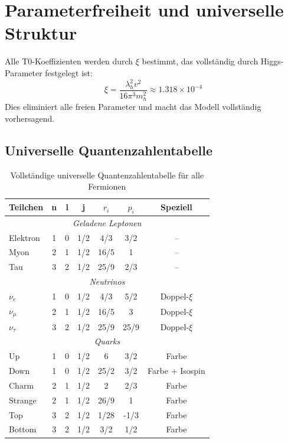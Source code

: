 \section{Parameterfreiheit und universelle Struktur}
\label{sec:parameter_free_nature}

\begin{important}
	Alle T0-Koeffizienten werden durch $\xi$ bestimmt, das vollständig durch Higgs-Parameter festgelegt ist:
	\begin{equation}
		\xi = \frac{\lambda_h^2 v^2}{16\pi^3 m_h^2} \approx 1.318 \times 10^{-4}
	\end{equation}
	Dies eliminiert alle freien Parameter und macht das Modell vollständig vorhersagend.
\end{important}

\subsection{Universelle Quantenzahlentabelle}
\label{subsec:universal_quantum_table}

\begin{table}[H]
	\centering
	\begin{tabular}{lcccccc}
		\toprule
		\textbf{Teilchen} & \textbf{n} & \textbf{l} & \textbf{j} & \textbf{$r_i$} & \textbf{$p_i$} & \textbf{Speziell} \\
		\midrule
		\multicolumn{7}{c}{\textit{Geladene Leptonen}} \\
		\midrule
		Elektron & 1 & 0 & 1/2 & 4/3 & 3/2 & -- \\
		Myon & 2 & 1 & 1/2 & 16/5 & 1 & -- \\
		Tau & 3 & 2 & 1/2 & 25/9 & 2/3 & -- \\
		\midrule
		\multicolumn{7}{c}{\textit{Neutrinos}} \\
		\midrule
		$\nu_e$ & 1 & 0 & 1/2 & 4/3 & 5/2 & Doppel-$\xi$ \\
		$\nu_\mu$ & 2 & 1 & 1/2 & 16/5 & 3 & Doppel-$\xi$ \\
		$\nu_\tau$ & 3 & 2 & 1/2 & 25/9 & 25/9 & Doppel-$\xi$ \\
		\midrule
		\multicolumn{7}{c}{\textit{Quarks}} \\
		\midrule
		Up & 1 & 0 & 1/2 & 6 & 3/2 & Farbe \\
		Down & 1 & 0 & 1/2 & 25/2 & 3/2 & Farbe + Isospin \\
		Charm & 2 & 1 & 1/2 & 2 & 2/3 & Farbe \\
		Strange & 2 & 1 & 1/2 & 26/9 & 1 & Farbe \\
		Top & 3 & 2 & 1/2 & 1/28 & -1/3 & Farbe \\
		Bottom & 3 & 2 & 1/2 & 3/2 & 1/2 & Farbe \\
		\bottomrule
	\end{tabular}
	\caption{Vollständige universelle Quantenzahlentabelle für alle Fermionen}
	\label{tab:universal_quantum_numbers}
\end{table}

